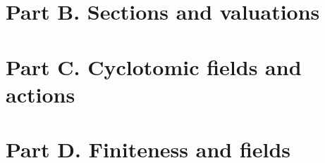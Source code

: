 \documentclass[11pt,a4paper]{article}
\begin{document}





















\section{Part B. Sections and valuations}


\section{Part C. Cyclotomic fields and actions}


\section{Part D. Finiteness and fields}




\end{document}
